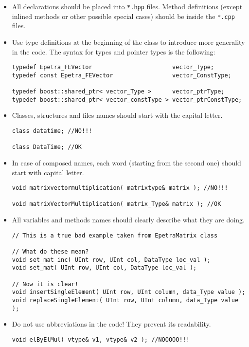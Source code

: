 \documentclass[a4paper]{article}
\begin{document}
\begin{itemize}
  \item All declarations should be placed into \texttt{*.hpp} files. Method
  definitions (except inlined methods or other possible special cases)
  should be inside the \texttt{*.cpp} files.
  \item Use type definitions at the beginning of the class to introduce more
  generality in the code. The syntax for types and pointer types is
  the following:
\begin{lstlisting}
typedef Epetra_FEVector                       vector_Type;
typedef const Epetra_FEVector                 vector_ConstType;

typedef boost::shared_ptr< vector_Type >      vector_ptrType;
typedef boost::shared_ptr< vector_constType > vector_ptrConstType;
\end{lstlisting}
  \item Classes, structures and files names should start with the capital
  letter.
\begin{lstlisting}
class datatime; //NO!!!

class DataTime; //OK
\end{lstlisting}
  \item In case of composed names, each word (starting from the second one)
  should start with capital letter.
\begin{lstlisting}
void matrixvectormultiplication( matrixtype& matrix ); //NO!!!

void matrixVectorMultiplication( matrix_Type& matrix ); //OK
\end{lstlisting}
  \item All variables and methods names should clearly describe what they are
  doing.
\begin{lstlisting}
// This is a true bad example taken from EpetraMatrix class

// What do these mean?
void set_mat_inc( UInt row, UInt col, DataType loc_val );
void set_mat( UInt row, UInt col, DataType loc_val );

// Now it is clear!
void insertSingleElement( UInt row, UInt column, data_Type value );
void replaceSingleElement( UInt row, UInt column, data_Type value );

  \end{lstlisting}
  \item Do not use abbreviations in the code! They prevent its readability.
\begin{lstlisting}
void elByElMul( vtype& v1, vtype& v2 ); //NOOOOO!!!


\end{lstlisting}
\end{itemize}
\end{document}
